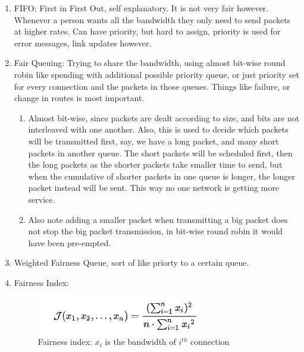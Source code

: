 \documentclass[12pt]{book}
\begin{document}
\begin{enumerate}
    \item FIFO:
    First in First Out, self explanatory. It is not very fair however. Whenever a person wants all the bandwidth they only need to send packets at higher rates. Can have priority, but hard to assign, priority is used for error messages, link updates however.
    \item Fair Queuing:
    Trying to share the bandwidth, using almost bit-wise round robin like spending with additional possible priority queue, or just priority set for every connection and the packets in those queues. Things like failure, or change in routes is most important.
    \begin{enumerate}
        \item Almost bit-wise, since packets are dealt according to size, and bits are not interleaved with one another. Also, this is used to decide which packets will be transmitted first, say, we have a long packet, and many short packets in another queue. The short packets will be scheduled first, then the long packets as the shorter packets take smaller time to send, but when the cumulative of shorter packets in one queue is longer, the longer packet instead will be sent. This way no one network is getting more service.
        \item Also note adding a smaller packet when transmitting a big packet does not stop the big packet transmission, in bit-wise round robin it would have been pre-empted.
    \end{enumerate}
    \item Weighted Fairness Queue, sort of like priorty to a certain queue.
    \item Fairness Index:
    \begin{figure}[H]
        \centering
        \includegraphics{Pictures/fairness index.png}
        \caption{Fairness index: $x_i$ is the bandwidth of $i^{th}$ connection}
        \label{fig:Fairness Index}
    \end{figure}
\end{enumerate}
\end{document}
